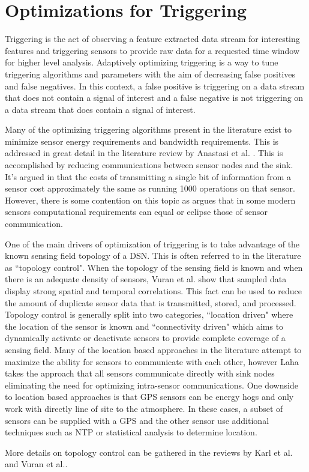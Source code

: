 \section{Optimizations for Triggering}\label{sec:optimizations-for-triggering}
Triggering is the act of observing a feature extracted data stream for interesting features and triggering sensors to provide raw data for a requested time window for higher level analysis. Adaptively optimizing triggering is a way to tune triggering algorithms and parameters with the aim of decreasing false positives and false negatives. In this context, a false positive is triggering on a data stream that does not contain a signal of interest and a false negative is not triggering on a data stream that does contain a signal of interest.

Many of the optimizing triggering algorithms present in the literature exist to minimize sensor energy requirements and bandwidth requirements. This is addressed in great detail in the literature review by Anastasi et al. \cite{anastasi_energy_2009}. This is accomplished by reducing communications between sensor nodes and the sink. It's argued in \cite{pottie2000wireless} that the costs of transmitting a single bit of information from a sensor cost approximately the same as running 1000 operations on that sensor. However, there is some contention on this topic as \cite{alippi_adaptive_2010} argues that in some modern sensors computational requirements can equal or eclipse those of  sensor communication.

One of the main drivers of optimization of triggering is to take advantage of the known sensing field topology of a DSN. This is often referred to in the literature as ``topology control"\cite{santi2005topology}. When the topology of the sensing field is known and when there is an adequate density of sensors, Vuran et al.\cite{luan2015fog} show that sampled data display strong spatial and temporal correlations. This fact can be used to reduce the amount of duplicate sensor data that is transmitted, stored, and processed. Topology control is generally split into two categories, ``location  driven" where the location of the sensor is known and ``connectivity driven" which aims to dynamically activate or deactivate sensors to provide complete coverage of a sensing field. Many of the location based approaches in the literature attempt  to maximize the ability for sensors to communicate with each other, however Laha takes the approach that all sensors communicate directly with sink nodes eliminating the need for optimizing intra-sensor communications. One downside to location based approaches is that GPS sensors can be energy hogs and only work with directly line of site to the atmosphere. In these cases, a subset of sensors can be supplied with a GPS and the other sensor use additional techniques such as NTP or statistical analysis to determine location\cite{langendoen2003distributed}.

More details on topology control can be gathered in the reviews by Karl et al.\cite{karl2007protocols} and Vuran et al.\cite{vuran2004spatio}.







